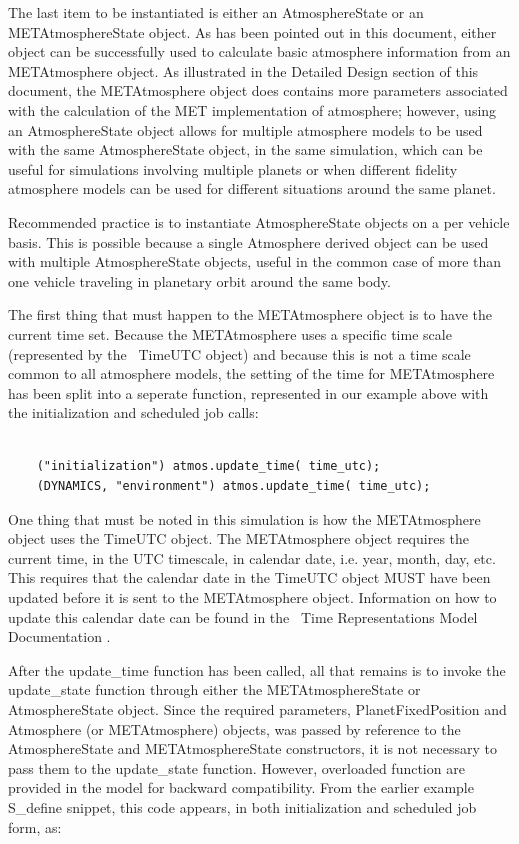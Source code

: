 The last item to be instantiated is either an AtmosphereState or an
METAtmosphereState object. As has been pointed out in this document, either
object can be successfully used to calculate basic atmosphere information from an
METAtmosphere object. As illustrated in the Detailed Design section of this
document, the METAtmosphere object does contains more parameters associated with
the calculation of the MET implementation of atmosphere; however, using an
AtmosphereState object allows for multiple atmosphere models to be used
with the same AtmosphereState object, in the same simulation, which can be useful
for simulations involving multiple planets or when different fidelity atmosphere
models can be used for different situations around the same planet.

Recommended practice is to instantiate AtmosphereState objects on a per vehicle
basis. This is possible because a single Atmosphere derived object can be used
with multiple AtmosphereState objects, useful in the common case of more than
one vehicle traveling in planetary orbit around the same body.


The first thing that must happen to the METAtmosphere object is to have the
current time set. Because the METAtmosphere uses a specific time scale (represented
by the \JEODid\ TimeUTC object) and because this is not a time scale common to all
atmosphere models, the setting of the time for METAtmosphere has been split into
a seperate function, represented in our example above with the initialization
and scheduled job calls:

\begin{verbatim}

    ("initialization") atmos.update_time( time_utc);
    (DYNAMICS, "environment") atmos.update_time( time_utc);

\end{verbatim}

One thing that must be noted in this simulation is how the METAtmosphere object
uses the TimeUTC object. The METAtmosphere object requires the current time, in
the UTC timescale, in calendar date, i.e. year, month, day, etc. This requires that
the calendar date in the TimeUTC object MUST have been updated before it is sent
to the METAtmosphere object. Information on how to update this calendar date can be
found in the \JEODid\ Time Representations Model Documentation \cite{dynenv:TIME}.

After the update\_time function has been called, all that remains is to invoke
the update\_state function through either the METAtmosphereState or AtmosphereState
object. Since the required parameters, PlanetFixedPosition and Atmosphere (or METAtmosphere) objects,
was passed by reference to the AtmosphereState and METAtmosphereState constructors,
it is not necessary to pass them to the update\_state function.
However, overloaded function are provided in the model for backward compatibility.
From the earlier example S\_define snippet, this code appears, in both
initialization and scheduled job form, as:

